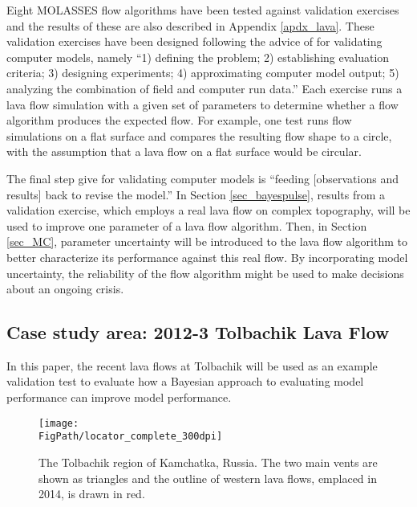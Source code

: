 	Eight MOLASSES flow algorithms have been tested against validation exercises and the results of these are also described in Appendix \ref{apdx_lava}. These validation exercises have been designed following the advice of \citet{bayarri2007framework} for validating computer models, namely ``1) defining the problem; 2) establishing evaluation criteria; 3) designing experiments; 4) approximating computer model output; 5) analyzing the combination of field and computer run data.'' Each exercise runs a lava flow simulation with a given set of parameters to determine whether a flow algorithm produces the expected flow. For example, one test runs flow simulations on a flat surface and compares the resulting flow shape to a circle, with the assumption that a lava flow on a flat surface would be circular.
	
	The final step \citet{bayarri2007framework} give for validating computer models is ``feeding [observations and results] back to revise the model.'' In Section \ref{sec_bayespulse}, results from a validation exercise, which employs a real lava flow on complex topography, will be used to improve one parameter of a lava flow algorithm. Then, in Section \ref{sec_MC}, parameter uncertainty will be introduced to the lava flow algorithm to better characterize its performance against this real flow. By incorporating model uncertainty, the reliability of the flow algorithm might be used to make decisions about an ongoing crisis.
	
	\subsection{Case study area: 2012-3 Tolbachik Lava Flow}\label{sec_tolb_back}
	In this paper, the recent lava flows at Tolbachik will be used as an example validation test to evaluate how a Bayesian approach to evaluating model performance can improve model performance. 
	
\begin{figure}[!h]
	\centering
	\texttt{[image: \\FigPath/locator\_complete\_300dpi]}
	\caption[The Tolbachik region of Kamchatka, Russia]{The Tolbachik region of Kamchatka, Russia. The two main vents are shown as triangles and the outline of western lava flows, emplaced in 2014, is drawn in red.}
	\label{fig_locator}
\end{figure}
	

